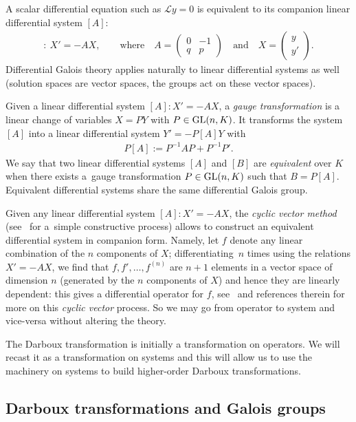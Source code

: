 \documentclass[pdftex]{sigma}%
\numberwithin{equation}{section}
\begin{document}
A scalar differential equation such as $\mathcal Ly=0$ is equivalent to its companion linear differential system $[A]$:
\begin{gather*}%
[A]\colon\ X'=-AX,\qquad \text{where}\quad A=\begin{pmatrix}0&-1\\ q& p\end{pmatrix}
\quad \text{and}\quad X=\begin{pmatrix} y \\ y'\end{pmatrix}\!.
\end{gather*}
Differential Galois theory applies naturally to linear differential systems as well (solution spaces are vector spaces, the groups act on these vector spaces).

Given a linear differential system $[A]\colon X'=-AX$, a \emph{gauge transformation} is a linear change of variables $X=PY$ with $P \in {\rm GL}(n,K)$. It transforms the system $[A]$ into a linear differential system $Y'=-P[A] Y$ with
\begin{gather*}
P[A]:= P^{-1} A P + P^{-1} P'.
\end{gather*}
We say that two linear differential systems $[A]$ and $[B]$ are \emph{equivalent} over $K$ when there exists a~gauge transformation $P \in {\rm GL}(n,K)$ such that $B=P[A]$. Equivalent differential systems share the same differential Galois group.

Given any linear differential system $[A]\colon X'=-AX$, the \emph{cyclic vector method} (see~\cite{Ba93a} for a~simple constructive process) allows to construct an equivalent differential system in companion form. Namely, let $f$ denote any linear combination of the $n$ components of $X$; differentiating~$n$ times using the relations $X'=-AX$, we find that $f, f', \ldots, f^{(n)}$ are $n+1$ elements in a vector space of dimension $n$ (generated by the $n$ components of $X$) and hence they are linearly dependent: this gives a differential operator for $f$, see~\cite{Ba93a} and references therein for more on this \emph{cyclic vector} process. So we may go from operator to system and vice-versa without altering the theory.

The Darboux transformation is initially a transformation on operators. We will recast it as a transformation on systems and this will allow us to use the machinery on systems to build higher-order Darboux transformations.

\subsection{Darboux transformations and Galois groups}
\end{document}
